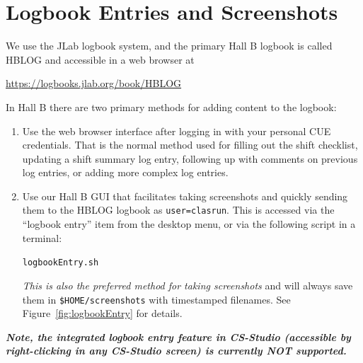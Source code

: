 \documentclass[amsmath,amssymb,notitlepage,11pt]{revtex4}
\begin{document}
\section{Logbook Entries and Screenshots}\label{sec:logentry}
We use the JLab logbook system, and the primary Hall B logbook is called HBLOG and accessible in a web browser at
\begin{center}\url{https://logbooks.jlab.org/book/HBLOG}\end{center}
In Hall B there are two primary methods for adding content to the logbook:
\begin{enumerate}
\item Use the web browser interface after logging in with your personal CUE credentials.  That is the normal method used for filling out the shift checklist, updating a shift summary log entry, following up with comments on previous log entries, or adding more complex log entries.
\item Use our Hall B GUI that facilitates taking screenshots and quickly sending them to the HBLOG logbook as \texttt{user=clasrun}.  This is accessed via the ``logbook entry'' item from the desktop menu, or via the following script in a terminal:
\begin{center}\texttt{logbookEntry.sh}\end{center}
    {\em This is also the preferred method for taking screenshots} and will always save them in \texttt{\$HOME/screenshots} with timestamped filenames.  See Figure~\ref{fig:logbookEntry} for details.
\end{enumerate}
\bf{\em Note, the integrated logbook entry feature in CS-Studio (accessible by right-clicking in any CS-Studio screen) is currently NOT supported.} 
\end{document}
